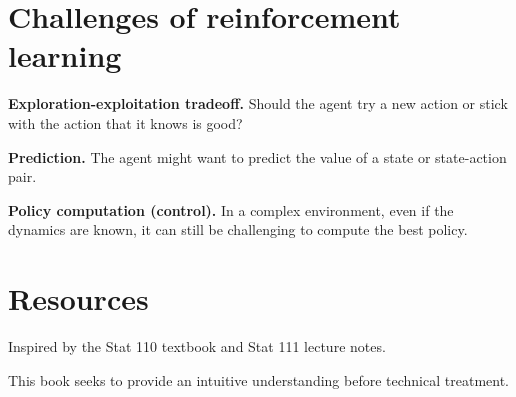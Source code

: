 \documentclass[\main/main]{subfiles}
\begin{document}
\section{Challenges of reinforcement learning}

\textbf{Exploration-exploitation tradeoff.} Should the agent try a new action or stick with the action that it knows is good?

\textbf{Prediction.} The agent might want to predict the value of a state or state-action pair.

\textbf{Policy computation (control).} In a complex environment, even if the dynamics are known, it can still be challenging to compute the best policy.


\section{Resources}

Inspired by the Stat 110 textbook and Stat 111 lecture notes.

This book seeks to provide an intuitive understanding before technical treatment.

\end{document}
